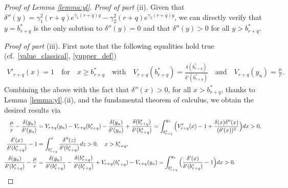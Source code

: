 \documentclass[11pt]{article} %
\numberwithin{komcounter}{section}
\numberwithin{equation}{section}
\numberwithin{theorem}{section}
\begin{document}
\begin{proof}[Proof of Lemma \ref{lemma:yl}]
\vspace{1mm}
{\it Proof of part} (ii).
Given that 
$\delta''(y) = \gamma_1^2(r+q)e^{\gamma_1(r+q)y} - \gamma_2^2(r+q)e^{\gamma_2(r+q)y}$, we can directly verify that $y = b^*_{r+q}$ is the only solution to $\delta''(y)=0$ and that $\delta''(y)>0$ for all $y > b^*_{r+q}$. 

\vspace{1mm}
{\it Proof of part} (iii).
First note that the following equalities hold true (cf.~\eqref{value_classical}, \eqref{yupper_def}) 
\begin{align*} 
V'_{r+q}(x)=1 \quad \text{for} \quad x \geq b^*_{r+q} 
\quad \text{with} \quad 
V_{r+q}(b^*_{r+q}) = \tfrac{\delta(b^*_{r+q})}{\delta'(b^*_{r+q})} 
\quad \text{and} \quad 
V_{r+q}(y_u)=\frac{\mu}{r}. 
\end{align*}
Combining the above with 
the fact that $\delta''(x)>0$, for all $x > b^*_{r+q}$, thanks to Lemma \ref{lemma:yl}.(ii), and the fundamental theorem of calculus, we obtain the desired results via 
\begin{align*}
\frac{\mu}{r} - \frac{\delta(y_u)}{\delta'(y_u)} 
&= V_{r+q}(y_u) - V_{r+q}(b^*_{r+q}) - \frac{\delta(y_u)}{\delta'(y_u)} + \frac{\delta(b^*_{r+q})}{\delta'(b^*_{r+q})} 
= \int_{b^*_{r+q}}^{y_u} \Big( V_{r+q}'(x) - 1 + \frac{\delta(x)\delta''(x)}{(\delta'(x))^2} \Big) dx > 0, \notag\\
\frac{\delta'(x)}{\delta'(b^*_{r+q})} - 1 &= \int_{b^*_{r+q}}^{x} \frac{\delta''(z)}{\delta'(b^*_{r+q})} dz > 0, \quad x>b^*_{r+q}, \\
\frac{\delta(y_u)}{\delta'(b^*_{r+q})} - \frac{\mu}{r} 
&= \frac{\delta(y_u)}{\delta'(b^*_{r+q})} - \frac{\delta(b^*_{r+q})}{\delta'(b^*_{r+q})} + V_{r+q}(b^*_{r+q}) - V_{r+q}(y_u) = \int_{b^*_{r+q}}^{y_u} \Big(\frac{\delta'(x)}{\delta'(b^*_{r+q})} - 1 \Big) dx > 0.
\end{align*}


\end{proof}
\end{document}
